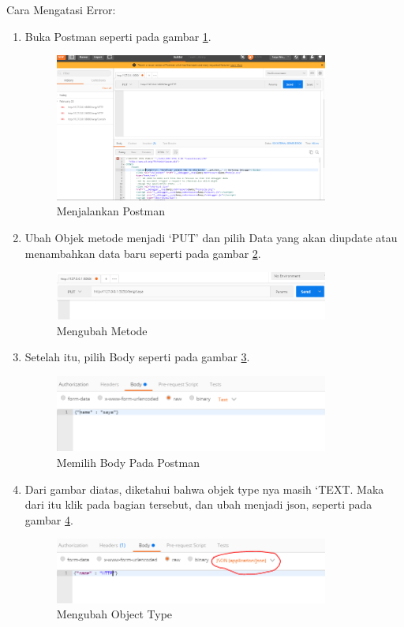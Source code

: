 Cara Mengatasi Error:
\begin{enumerate}
\item Buka Postman seperti pada gambar \ref{fig:jp}.
\begin{figure}[!htbp]
	\centerline{\includegraphics[width=0.85\textwidth]{figures/11/jp.PNG}}
	\caption{Menjalankan Postman}
	\label{fig:jp}
\end{figure}

\item Ubah Objek metode menjadi ‘PUT’ dan pilih Data yang akan diupdate atau menambahkan data baru seperti pada gambar \ref{fig:um}.
\begin{figure}[!htbp]
	\centerline{\includegraphics[width=0.85\textwidth]{figures/11/um.PNG}}
	\caption{Mengubah Metode}
	\label{fig:um}
\end{figure}

\item Setelah itu, pilih Body seperti pada gambar \ref{fig:mbp}.
\begin{figure}[!htbp]
	\centerline{\includegraphics[width=0.85\textwidth]{figures/11/mbp.PNG}}
	\caption{Memilih Body Pada Postman}
	\label{fig:mbp}
\end{figure}

\item Dari gambar diatas, diketahui bahwa objek type nya masih ‘TEXT. Maka dari itu klik pada bagian tersebut, dan ubah menjadi json, seperti pada gambar \ref{fig:mot}.
\begin{figure}[!htbp]
	\centerline{\includegraphics[width=0.85\textwidth]{figures/11/mot.PNG}}
	\caption{Mengubah Object Type}
	\label{fig:mot}
\end{figure}


\end{enumerate}
